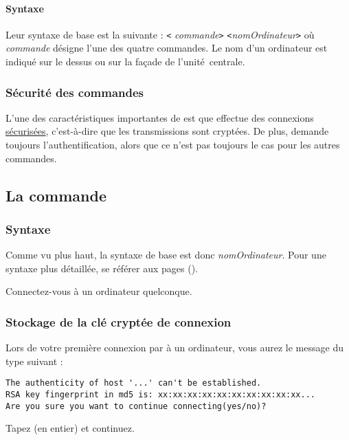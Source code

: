 \documentclass[11pt,a4paper]{article}
\begin{document}
\paragraph{Syntaxe}

Leur syntaxe de base est la suivante : \verb+<+{\em
commande}\verb+>+ \verb+<+{\em nomOrdinateur}\verb+>+ où {\em
commande} désigne l'une des quatre commandes. Le nom d'un ordinateur
est indiqué sur le dessus ou sur la façade de l'unité~centrale.

\subsubsection{Sécurité des commandes}

L'une des caractéristiques importantes de  
est que  effectue des connexions
\underline{sécurisées}, c'est-à-dire que les transmissions
sont cryptées. De plus,  demande toujours
l'authentification, alors que ce n'est pas toujours le cas pour
les autres commandes.


\subsection{La commande }

\subsubsection{Syntaxe}

Comme vu plus haut, la syntaxe de base est donc 
{\em nomOrdinateur}. Pour une syntaxe plus détaillée, se référer
aux pages  ().

\begin{maw}
Connectez-vous à un ordinateur quelconque.
\end{maw}

\subsubsection{Stockage de la clé cryptée de connexion}

Lors de votre première connexion par  à un ordinateur, vous
aurez le message du type suivant :
\begin{verbatim}
The authenticity of host '...' can't be established.
RSA key fingerprint in md5 is: xx:xx:xx:xx:xx:xx:xx:xx:xx:xx...
Are you sure you want to continue connecting(yes/no)?
\end{verbatim}
Tapez  (en entier) et continuez.
\end{document}
